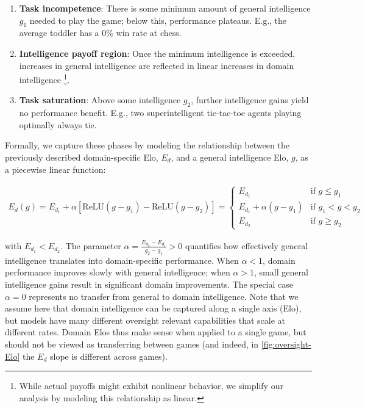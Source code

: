 \documentclass{article}
\begin{document}
\begin{enumerate}[align=left,leftmargin=*]
    \item \textbf{Task incompetence}: There is some minimum amount of general intelligence $g_1$ needed to play the game; below this, performance plateaus. E.g., the average toddler has a 0\% win rate at chess.
    \item \textbf{Intelligence payoff region}: Once the minimum intelligence is exceeded, increases in general intelligence are reflected in linear increases in domain intelligence \footnote{While actual payoffs might exhibit nonlinear behavior, we simplify our analysis by modeling this relationship as linear.}.
    \item \textbf{Task saturation}: Above some intelligence $g_2$, further intelligence gains yield no performance benefit. E.g., two superintelligent tic-tac-toe agents playing optimally always tie.
\end{enumerate}

Formally, we capture these phases by modeling the relationship between the previously described domain-specific Elo, $E_d$, and a general intelligence Elo, $g$, as a piecewise linear function:

\begin{align}
\label{eqn:double_relu}
E_d(g) = E_{d_1} + \alpha \left[\textrm{ReLU}(g-g_1)-\textrm{ReLU}(g-g_2)\right]=
\begin{cases}
E_{d_1} & \text{if } g \leq g_1 \\
E_{d_1} + \alpha (g - g_1) & \text{if } g_1 < g < g_2 \\
E_{d_2} & \text{if } g \geq g_2
\end{cases}
\end{align}

with $E_{d_1} < E_{d_2}$. The parameter $\alpha = \frac{E_{d_2} - E_{d_1}}{g_2 - g_1} > 0$ quantifies how effectively general intelligence translates into domain-specific performance. When $\alpha < 1$, domain performance improves slowly with general intelligence; when $\alpha > 1$, small general intelligence gains result in significant domain improvements. The special case $\alpha = 0$ represents no transfer from general to domain intelligence. Note that we assume here that domain intelligence can be captured along a single axis (Elo), but models have many different oversight relevant capabilities that scale at different rates. Domain Elos thus make sense when applied to a single game, but should not be viewed as transferring between games (and indeed, in \cref{fig:oversight-Elo} the $E_d$ slope is different across games).
\end{document}
